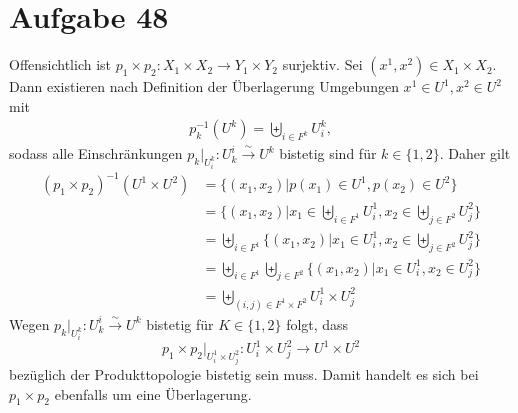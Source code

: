 \documentclass{article}
\begin{document}
  \section*{Aufgabe 48}
    Offensichtlich ist $p_1 \times p_2 \colon X_1 \times X_2 \to Y_1 \times Y_2$ surjektiv.
    Sei $(x^1, x^2) \in X_1 \times X_2$. Dann existieren nach Definition der Überlagerung Umgebungen $x^1 \in U^1, x^2 \in U^2$ mit
    \begin{align*}
      p_k^{-1}(U^k) = \biguplus_{i\in F^k}U^k_i,
    \end{align*}
    sodass alle Einschränkungen $p_k|_{U^k_i}\colon U_k^i \overset{\sim}{\to} U^k$ bistetig sind für $k \in \{1,2\}$.
    Daher gilt
    \begin{align*}
      (p_1 \times p_2)^{-1}(U^1 \times U^2) &= \{(x_1, x_2) | p(x_1) \in U^1, p(x_2) \in U^2\}\\
      &= \{(x_1, x_2) | x_1 \in \biguplus_{i\in F^1}U^1_i, x_2 \in \biguplus_{j\in F^2}U^2_j\}\\
      &= \biguplus_{i\in F^1} \{(x_1, x_2) | x_1 \in U^1_i, x_2 \in \biguplus_{j\in F^2}U^2_j\}\\
      &= \biguplus_{i\in F^1} \biguplus_{j\in F^2} \{(x_1, x_2) | x_1 \in U^1_i, x_2 \in U^2_j\}\\
      &= \biguplus_{(i,j) \in F^1\times F^2} U^1_i \times U^2_j
    \end{align*}
    Wegen $p_k|_{U^k_i}\colon U_k^i \overset{\sim}{\to} U^k$ bistetig für $K \in \{1,2\}$ folgt, dass
    \[
        p_1 \times p_2|_{U^1_i\times U^2_j} \colon U^1_i \times U^2_j \to U^1 \times U^2
    \]
    bezüglich der Produkttopologie bistetig sein muss.
    Damit handelt es sich bei $p_1 \times p_2$ ebenfalls um eine Überlagerung.
\end{document}
